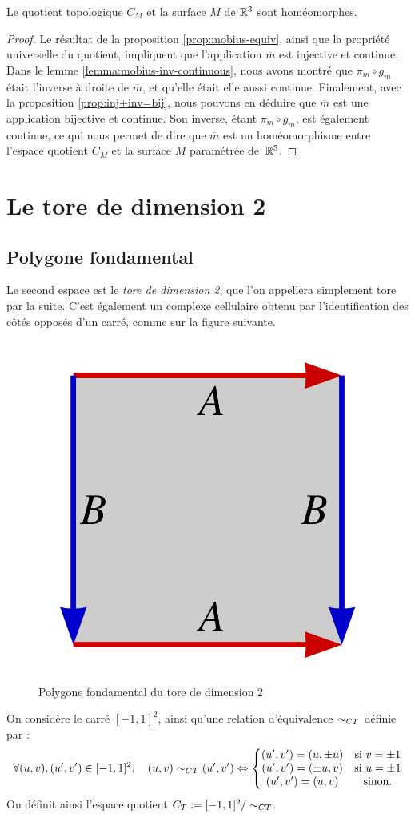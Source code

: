 \documentclass[hidelinks, 10pt]{article}
\begin{document}
\begin{theorem}\label{th:mobius-homeo}
Le quotient topologique $C_M$ et la surface $M$ de $\mathbb{R}^3$ sont homéomorphes.
\end{theorem}
\begin{proof}
Le résultat de la proposition \ref{prop:mobius-equiv}, ainsi que la propriété universelle du quotient, impliquent que l'application $\overline{m}$ est injective et continue. Dans le lemme \ref{lemma:mobius-inv-continuous}, nous avons montré que $\pi_m\circ g_m$ était l'inverse à droite de $\overline{m}$, et qu'elle était elle aussi continue. Finalement, avec la proposition \ref{prop:inj+inv=bij}, nous pouvons en déduire que $\overline{m}$ est une application bijective et continue. Son inverse, étant $\pi_m\circ g_m$, est également continue, ce qui nous permet de dire que $\overline{m}$ est un homéomorphisme entre l'espace quotient $C_M$ et la surface $M$ paramétrée de~$\mathbb{R}^3$.
\end{proof}

\section{Le tore de dimension 2}
\subsection{Polygone fondamental}

Le second espace est le \emph{tore de dimension 2}, que l'on appellera simplement tore par la suite. C'est également un complexe cellulaire obtenu par l'identification des côtés opposés d'un carré, comme sur la figure suivante.

\begin{figure}[H]
    \centering
    \includegraphics[width=0.3\linewidth]{pictures/TorusAsSquare.png}
    \caption{Polygone fondamental du tore de dimension 2}
    \label{fig:torus-as-square}
\end{figure}

\begin{definition}
On considère le carré $[-1,1]^2$, ainsi qu'une relation d'équivalence $\sim_{CT}$ définie par : \[\forall(u,v),(u',v')\in [-1,1]^2,\quad (u,v)\sim_{CT}(u',v')\Leftrightarrow\left\{\begin{matrix}
(u',v')=(u,\pm u) & \text{si }v=\pm1 \\ 
(u',v')=(\pm u,v) & \text{si }u=\pm1\\
(u',v')=(u,v)&\text{sinon}.
\end{matrix}\right.\]On définit ainsi l'espace quotient $C_T:=[-1,1]^2/\sim_{CT}$.
\end{definition}
\end{document}
